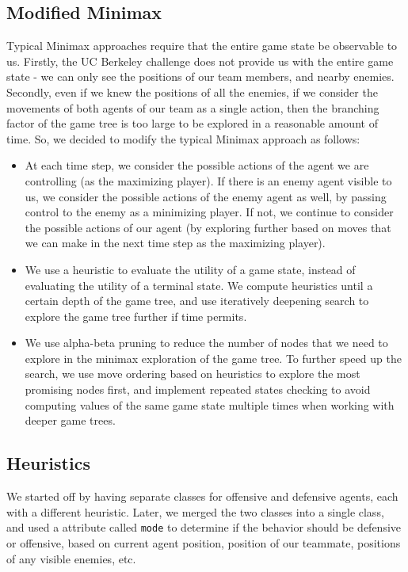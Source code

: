 \documentclass[a4paper,12pt]{article}
\begin{document}
\subsection{Modified Minimax}
\label{subsec:modified_minimax}
Typical Minimax approaches require that the entire game state be observable to us. Firstly, the UC Berkeley challenge does not provide us with the entire game state - we can only see the positions of our team members, and nearby enemies. Secondly, even if we knew the positions of all the enemies, if we consider the movements of both agents of our team as a single action, then the branching factor of the game tree is too large to be explored in a reasonable amount of time. So, we decided to modify the typical Minimax approach as follows:

\begin{itemize}
  \item At each time step, we consider the possible actions of the agent we are controlling (as the maximizing player). If there is an enemy agent visible to us, we consider the possible actions of the enemy agent as well, by passing control to the enemy as a minimizing player. If not, we continue to consider the possible actions of our agent (by exploring further based on moves that we can make in the next time step as the maximizing player). %
  \item We use a heuristic to evaluate the utility of a game state, instead of evaluating the utility of a terminal state. We compute heuristics until a certain depth of the game tree, and use iteratively deepening search to explore the game tree further if time permits.
  \item We use alpha-beta pruning to reduce the number of nodes that we need to explore in the minimax exploration of the game tree. To further speed up the search, we use move ordering based on heuristics to explore the most promising nodes first, and implement repeated states checking to avoid computing values of the same game state multiple times when working with deeper game trees.
\end{itemize}

\subsection{Heuristics}
\label{subsec:heuristics}

We started off by having separate classes for offensive and defensive agents, each with a different heuristic. Later, we merged the two classes into a single class, and used a attribute called \texttt{mode} to determine if the behavior should be defensive or offensive, based on current agent position, position of our teammate, positions of any visible enemies, etc.
\end{document}
